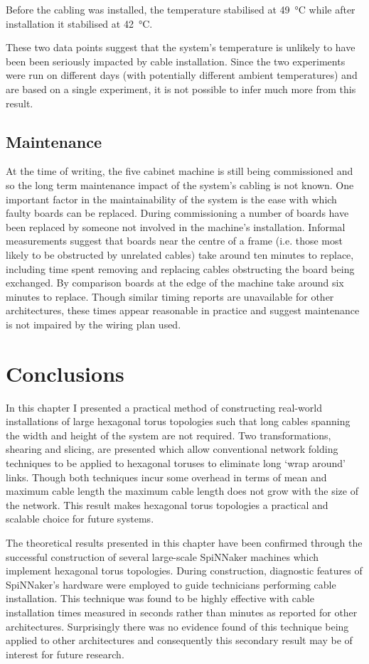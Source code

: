 			Before the cabling was installed, the temperature stabilised at
			\SI{49}{\celsius} while after installation it stabilised at
			\SI{42}{\celsius}.
			
			These two data points suggest that the system's temperature is unlikely
			to have been been seriously impacted by cable installation. Since the two
			experiments were run on different days (with potentially different
			ambient temperatures) and are based on a single experiment, it is not
			possible to infer much more from this result.
			
		\subsection{Maintenance}
			
			At the time of writing, the five cabinet machine is still being
			commissioned and so the long term maintenance impact of the system's
			cabling is not known. One important factor in the maintainability of the
			system is the ease with which faulty boards can be replaced. During
			commissioning a number of boards have been replaced by someone not
			involved in the machine's installation. Informal measurements suggest
			that boards near the centre of a frame (i.e. those most likely to be
			obstructed by unrelated cables) take around ten minutes to replace,
			including time spent removing and replacing cables obstructing the board
			being exchanged. By comparison boards at the edge of the machine take
			around six minutes to replace. Though similar timing reports are
			unavailable for other architectures, these times appear reasonable in
			practice and suggest maintenance is not impaired by the wiring plan used.
	
	\section{Conclusions}
		
		In this chapter I presented a practical method of constructing real-world
		installations of large hexagonal torus topologies such that long cables
		spanning the width and height of the system are not required. Two
		transformations, shearing and slicing, are presented which allow
		conventional network folding techniques to be applied to hexagonal toruses
		to eliminate long `wrap around' links. Though both techniques incur some
		overhead in terms of mean and maximum cable length the maximum cable length
		does not grow with the size of the network. This result makes hexagonal
		torus topologies a practical and scalable choice for future systems.
		
		The theoretical results presented in this chapter have been confirmed
		through the successful construction of several large-scale SpiNNaker
		machines which implement hexagonal torus topologies. During construction,
		diagnostic features of SpiNNaker's hardware were employed to guide
		technicians performing cable installation. This technique was found to be
		highly effective with cable installation times measured in seconds rather
		than minutes as reported for other architectures. Surprisingly there was no
		evidence found of this technique being applied to other architectures and
		consequently this secondary result may be of interest for future research.
